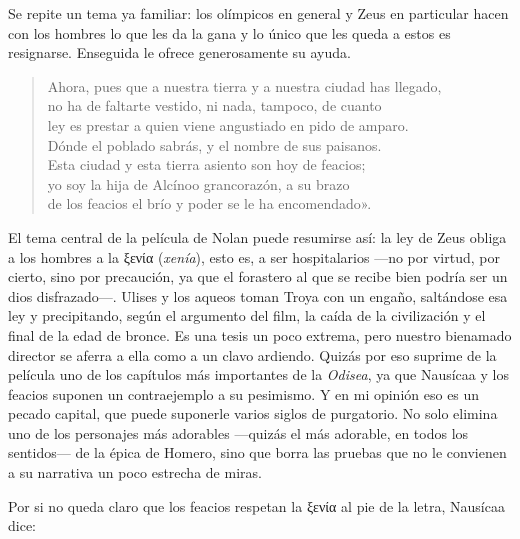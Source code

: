 \documentclass[11pt,a4paper]{article}
\newcommand{\gr}[1]{\foreignlanguage{greek}{#1}}
\begin{document}
Se repite un tema ya familiar: los olímpicos en general y Zeus en particular hacen con los hombres lo que les da la gana y lo único que les queda a estos es resignarse. Enseguida le ofrece generosamente su ayuda.

\begin{verse}
Ahora, pues que a nuestra tierra y a nuestra ciudad has llegado,\\
no ha de faltarte vestido, ni nada, tampoco, de cuanto\\
ley es prestar a quien viene angustiado en pido de amparo.\\
Dónde el poblado sabrás, y el nombre de sus paisanos.\\
Esta ciudad y esta tierra asiento son hoy de feacios;\\
yo soy la hija de Alcínoo grancorazón, a su brazo\\
de los feacios el brío y poder se le ha encomendado».
\end{verse}

El tema central de la película de Nolan puede resumirse así: la ley de Zeus obliga a los hombres a la \gr{ξενία} (\emph{xenía}), esto es, a ser hospitalarios ---no por virtud, por cierto, sino por precaución, ya que el forastero al que se recibe bien podría ser un dios disfrazado---. Ulises y los aqueos toman Troya con un engaño, saltándose esa ley y precipitando, según el argumento del film, la caída de la civilización y el final de la edad de bronce. Es una tesis un poco extrema, pero nuestro bienamado director se aferra a ella como a un clavo ardiendo. Quizás por eso suprime de la película uno de los capítulos más importantes de la \emph{Odisea}, ya que Nausícaa y los feacios suponen un contraejemplo a su pesimismo. Y en mi opinión eso es un pecado capital, que puede suponerle varios siglos de purgatorio. No solo elimina uno de los personajes más adorables ---quizás el más adorable, en todos los sentidos--- de la épica de Homero, sino que borra las pruebas que no le convienen a su narrativa un poco estrecha de miras.

Por si no queda claro que los feacios respetan la \gr{ξενία} al pie de la letra, Nausícaa dice:
\end{document}
